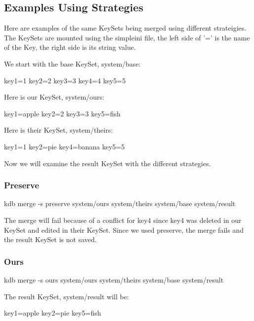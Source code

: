 \subsection*{Examples Using Strategies}

Here are examples of the same Key\+Sets being merged using different strateigies. The Key\+Sets are mounted using the simpleini file, the left side of '=' is the name of the Key, the right side is its string value.

We start with the base Key\+Set, system/base\+: \begin{DoxyVerb}    key1=1  
    key2=2  
    key3=3  
    key4=4  
    key5=5  
\end{DoxyVerb}


Here is our Key\+Set, system/ours\+: \begin{DoxyVerb}    key1=apple  
    key2=2  
    key3=3  
    key5=fish  
\end{DoxyVerb}


Here is their Key\+Set, system/theirs\+: \begin{DoxyVerb}    key1=1  
    key2=pie  
    key4=banana  
    key5=5  
\end{DoxyVerb}


Now we will examine the result Key\+Set with the different strategies.

\subsubsection*{Preserve}

\begin{DoxyVerb}    kdb merge -s preserve system/ours system/theirs system/base system/result
\end{DoxyVerb}


The merge will fail because of a conflict for key4 since key4 was deleted in our Key\+Set and edited in their Key\+Set. Since we used preserve, the merge fails and the result Key\+Set is not saved.

\subsubsection*{Ours}

\begin{DoxyVerb}    kdb merge -s ours system/ours system/theirs system/base system/result
\end{DoxyVerb}


The result Key\+Set, system/result will be\+: \begin{DoxyVerb}    key1=apple  
    key2=pie 
    key5=fish  
\end{DoxyVerb}


